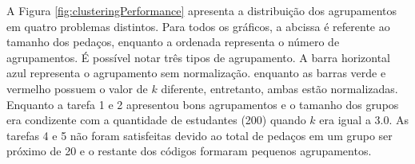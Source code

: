 		A Figura \ref{fig:clusteringPerformance} apresenta a distribuição dos
		agrupamentos em quatro problemas distintos. Para todos os gráficos, a
		abcissa é referente ao tamanho dos pedaços, enquanto a ordenada representa
		o número de agrupamentos. É possível notar três tipos de agrupamento. A barra
		horizontal azul representa o agrupamento sem normalização. enquanto as barras
		verde e vermelho possuem o valor de $k$ diferente, entretanto, ambas estão
		normalizadas. Enquanto a tarefa 1 e 2 apresentou bons agrupamentos e o tamanho
		dos grupos era condizente com a quantidade de estudantes (200) quando $k$ era
		igual a 3.0. As tarefas 4 e 5 não foram satisfeitas devido ao total de pedaços
		em um grupo ser próximo de 20 e o restante dos códigos formaram pequenos
		agrupamentos.
				

